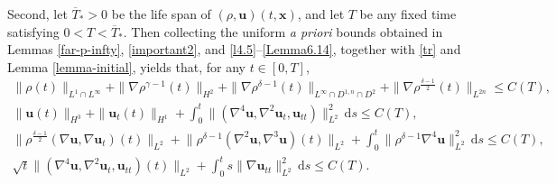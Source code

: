 \documentclass[11pt,reqno]{amsart}
\numberwithin{rk}{section}
\numberwithin{prop}{section}
\numberwithin{mydef}{section}
\numberwithin{lem}{section}
\numberwithin{equation}{section}
\numberwithin{thm}{section}
\begin{document}
Second, let $\overline{T}_*>0$ be the life span of $(\rho, \boldsymbol{u})(t,\boldsymbol{x})$, 
and let $T$ be any fixed time satisfying $0<T<\overline{T}_*$.
Then collecting the uniform {\it a priori} bounds obtained in Lemmas \ref{far-p-infty}, \ref{important2}, and \ref{l4.5}--\ref{Lemma6.14}, together with \eqref{tr} and Lemma \ref{lemma-initial}, yields that, for any  $t\in [0,T]$,
\begin{equation}\label{global-unifrom33}
\begin{aligned}
\|\rho(t)\|_{L^1\cap L^\infty}+\|\nabla\rho^{\gamma-1}(t)\|_{H^2}+\|\nabla\rho^{\delta-1}(t)\|_{L^\infty\cap D^{1,n}\cap D^2}+\|\nabla\rho^\frac{\delta-1}{2}(t)\|_{L^{2n}} \leq C(T),\\[3pt]
\|\boldsymbol{u}(t)\|_{H^3}+\|\boldsymbol{u}_t(t)\|_{H^1}+\int_0^t \big\|(\nabla^4\boldsymbol{u},\nabla^2\boldsymbol{u}_t,\boldsymbol{u}_{tt})\big\|_{L^2}^2 \,\mathrm{d}s\leq C(T),\\ 
\big\|\rho^\frac{\delta-1}{2} (\nabla\boldsymbol{u},\nabla\boldsymbol{u}_t)(t)\big\|_{L^2}+\big\|\rho^{\delta-1} (\nabla^2\boldsymbol{u}, \nabla^3\boldsymbol{u})(t)\big\|_{L^2}+\int_0^t \big\|\rho^{\delta-1}\nabla^4\boldsymbol{u}\big\|_{L^2}^2 \,\mathrm{d}s\leq C(T),\\ 
\sqrt{t}\big\|(\nabla^4\boldsymbol{u},\nabla^2\boldsymbol{u}_t,\boldsymbol{u}_{tt})(t)\big\|_{L^2}+\int_0^t s\|\nabla\boldsymbol{u}_{tt}\|_{L^2}^2\,\mathrm{d}s\leq C(T).
\end{aligned}
\end{equation}
\end{document}
